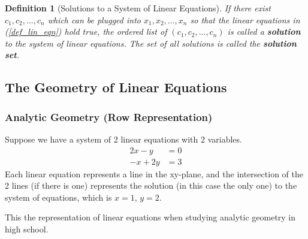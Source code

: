 \documentclass{article}
\newtheorem{definition}{Definition}[section] %
\begin{document}
\begin{definition}[Solutions to a System of Linear Equations]
If there exist \(c_1, c_2, ..., c_n\) which can be plugged into \(x_1, x_2, ..., x_n\) so that the linear equations in (\ref{def_lin_eqn}) hold true, the ordered list of \((c_1, c_2, ..., c_n)\) is called a \textbf{solution} to the system of linear equations. The set of all solutions is called the \textbf{solution set}.
\end{definition}

\subsection{The Geometry of Linear Equations}
\subsubsection{Analytic Geometry (Row Representation)}
Suppose we have a system of 2 linear equations with 2 variables.
    \begin{equation}\label{ex_lin_eqn}
    \begin{split}
    2x-y&=0 \\
    -x+2y&=3
    \end{split}
    \end{equation}
Each linear equation represents a line in the xy-plane, and the intersection of the 2 lines (if there is one) represents the solution (in this case the only one) to the system of equations, which is \(x=1\), \(y=2\).

\begin{center}
\end{center}

This the representation of linear equations when studying analytic geometry in high school.
\end{document}
